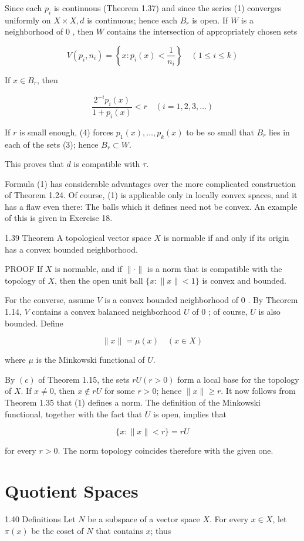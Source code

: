 \documentclass[10pt]{article}
\begin{document}
Since each $p_{i}$ is continuous (Theorem 1.37) and since the series (1) converges uniformly on $X \times X, d$ is continuous; hence each $B_{r}$ is open. If $W$ is a neighborhood of 0 , then $W$ contains the intersection of appropriately chosen sets

$$
V\left(p_{i}, n_{i}\right)=\left\{x: p_{i}(x)<\frac{1}{n_{i}}\right\} \quad(1 \leq i \leq k)
$$

If $x \in B_{r}$, then

$$
\frac{2^{-i} p_{i}(x)}{1+p_{i}(x)}<r \quad(i=1,2,3, \ldots)
$$

If $r$ is small enough, (4) forces $p_{1}(x), \ldots, p_{k}(x)$ to be so small that $B_{r}$ lies in each of the sets (3); hence $B_{r} \subset W$.

This proves that $d$ is compatible with $\tau$.

Formula (1) has considerable advantages over the more complicated construction of Theorem 1.24. Of course, (1) is applicable only in locally convex spaces, and it has a flaw even there: The balls which it defines need not be convex. An example of this is given in Exercise 18.

1.39 Theorem A topological vector space $X$ is normable if and only if its origin has a convex bounded neighborhood.

PROOF If $X$ is normable, and if $\|\cdot\|$ is a norm that is compatible with the topology of $X$, then the open unit ball $\{x:\|x\|<1\}$ is convex and bounded.

For the converse, assume $V$ is a convex bounded neighborhood of 0 . By Theorem 1.14, $V$ contains a convex balanced neighborhood $U$ of 0 ; of course, $U$ is also bounded. Define

$$
\|x\|=\mu(x) \quad(x \in X)
$$

where $\mu$ is the Minkowski functional of $U$.

By $(c)$ of Theorem 1.15, the sets $r U(r>0)$ form a local base for the topology of $X$. If $x \neq 0$, then $x \notin r U$ for some $r>0$; hence $\|x\| \geq r$. It now follows from Theorem 1.35 that (1) defines a norm. The definition of the Minkowski functional, together with the fact that $U$ is open, implies that

$$
\{x:\|x\|<r\}=r U
$$

for every $r>0$. The norm topology coincides therefore with the given one.

\section{Quotient Spaces}
1.40 Definitions Let $N$ be a subspace of a vector space $X$. For every $x \in X$, let $\pi(x)$ be the coset of $N$ that contains $x$; thus
\end{document}
